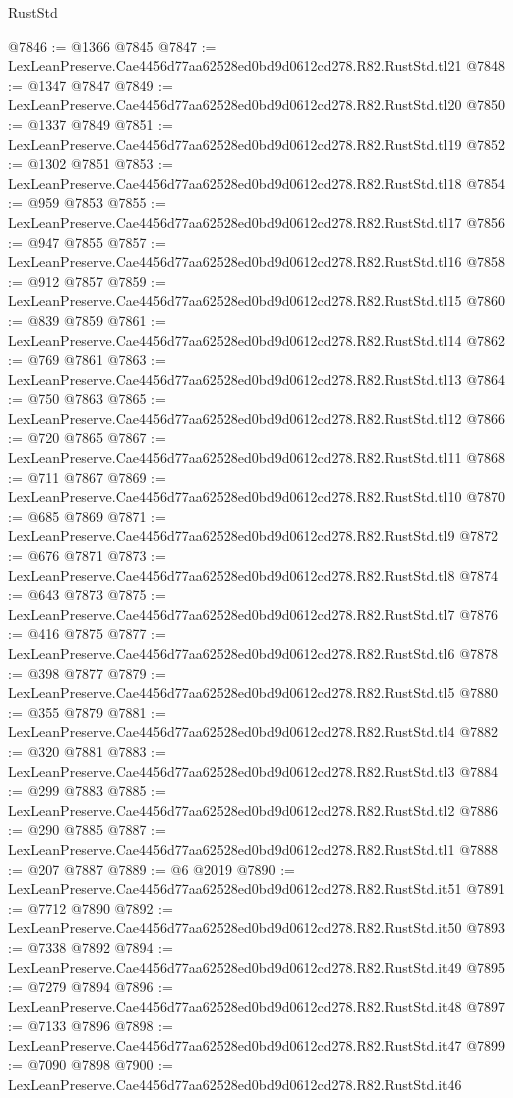 \begin{lexlean}{RustStd}
\begin{coremodule}
@7846 := @1366 @7845
@7847 := LexLeanPreserve.Cae4456d77aa62528ed0bd9d0612cd278.R82.RustStd.tl21
@7848 := @1347 @7847
@7849 := LexLeanPreserve.Cae4456d77aa62528ed0bd9d0612cd278.R82.RustStd.tl20
@7850 := @1337 @7849
@7851 := LexLeanPreserve.Cae4456d77aa62528ed0bd9d0612cd278.R82.RustStd.tl19
@7852 := @1302 @7851
@7853 := LexLeanPreserve.Cae4456d77aa62528ed0bd9d0612cd278.R82.RustStd.tl18
@7854 := @959 @7853
@7855 := LexLeanPreserve.Cae4456d77aa62528ed0bd9d0612cd278.R82.RustStd.tl17
@7856 := @947 @7855
@7857 := LexLeanPreserve.Cae4456d77aa62528ed0bd9d0612cd278.R82.RustStd.tl16
@7858 := @912 @7857
@7859 := LexLeanPreserve.Cae4456d77aa62528ed0bd9d0612cd278.R82.RustStd.tl15
@7860 := @839 @7859
@7861 := LexLeanPreserve.Cae4456d77aa62528ed0bd9d0612cd278.R82.RustStd.tl14
@7862 := @769 @7861
@7863 := LexLeanPreserve.Cae4456d77aa62528ed0bd9d0612cd278.R82.RustStd.tl13
@7864 := @750 @7863
@7865 := LexLeanPreserve.Cae4456d77aa62528ed0bd9d0612cd278.R82.RustStd.tl12
@7866 := @720 @7865
@7867 := LexLeanPreserve.Cae4456d77aa62528ed0bd9d0612cd278.R82.RustStd.tl11
@7868 := @711 @7867
@7869 := LexLeanPreserve.Cae4456d77aa62528ed0bd9d0612cd278.R82.RustStd.tl10
@7870 := @685 @7869
@7871 := LexLeanPreserve.Cae4456d77aa62528ed0bd9d0612cd278.R82.RustStd.tl9
@7872 := @676 @7871
@7873 := LexLeanPreserve.Cae4456d77aa62528ed0bd9d0612cd278.R82.RustStd.tl8
@7874 := @643 @7873
@7875 := LexLeanPreserve.Cae4456d77aa62528ed0bd9d0612cd278.R82.RustStd.tl7
@7876 := @416 @7875
@7877 := LexLeanPreserve.Cae4456d77aa62528ed0bd9d0612cd278.R82.RustStd.tl6
@7878 := @398 @7877
@7879 := LexLeanPreserve.Cae4456d77aa62528ed0bd9d0612cd278.R82.RustStd.tl5
@7880 := @355 @7879
@7881 := LexLeanPreserve.Cae4456d77aa62528ed0bd9d0612cd278.R82.RustStd.tl4
@7882 := @320 @7881
@7883 := LexLeanPreserve.Cae4456d77aa62528ed0bd9d0612cd278.R82.RustStd.tl3
@7884 := @299 @7883
@7885 := LexLeanPreserve.Cae4456d77aa62528ed0bd9d0612cd278.R82.RustStd.tl2
@7886 := @290 @7885
@7887 := LexLeanPreserve.Cae4456d77aa62528ed0bd9d0612cd278.R82.RustStd.tl1
@7888 := @207 @7887
@7889 := @6 @2019
@7890 := LexLeanPreserve.Cae4456d77aa62528ed0bd9d0612cd278.R82.RustStd.it51
@7891 := @7712 @7890
@7892 := LexLeanPreserve.Cae4456d77aa62528ed0bd9d0612cd278.R82.RustStd.it50
@7893 := @7338 @7892
@7894 := LexLeanPreserve.Cae4456d77aa62528ed0bd9d0612cd278.R82.RustStd.it49
@7895 := @7279 @7894
@7896 := LexLeanPreserve.Cae4456d77aa62528ed0bd9d0612cd278.R82.RustStd.it48
@7897 := @7133 @7896
@7898 := LexLeanPreserve.Cae4456d77aa62528ed0bd9d0612cd278.R82.RustStd.it47
@7899 := @7090 @7898
@7900 := LexLeanPreserve.Cae4456d77aa62528ed0bd9d0612cd278.R82.RustStd.it46

\end{coremodule}
\end{lexlean}
